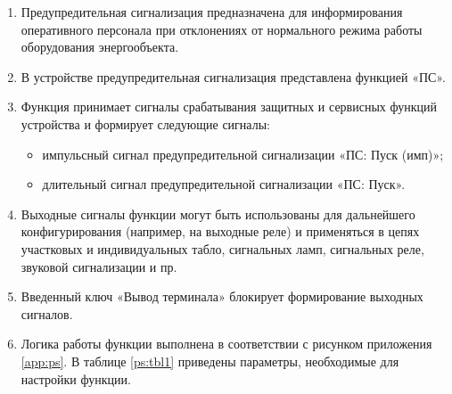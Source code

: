 
\color{black}

\begin{enumerate}

\item	
Предупредительная сигнализация предназначена для информирования оперативного персонала при отклонениях от нормального режима работы оборудования энергообъекта.

\item
В устройстве предупредительная сигнализация представлена функцией «ПС».

\item
Функция принимает сигналы срабатывания защитных и сервисных функций устройства и формирует следующие сигналы:
\begin{itemize}
	\item импульсный сигнал предупредительной сигнализации «ПС: Пуск (имп)»;
	\item длительный сигнал предупредительной сигнализации «ПС: Пуск».
\end{itemize}

\item
Выходные сигналы функции могут быть использованы для дальнейшего конфигурирования (например, на выходные реле) и применяться в цепях участковых и индивидуальных табло, сигнальных ламп, сигнальных реле, звуковой сигнализации и пр.

\item
Введенный ключ «Вывод терминала» блокирует формирование выходных сигналов.

\item
Логика работы функции выполнена в соответствии с рисунком приложения \ref{app:ps}. В таблице \ref{ps:tbl1} приведены параметры, необходимые для настройки функции. 

\end{enumerate}
\FloatBarrier %
